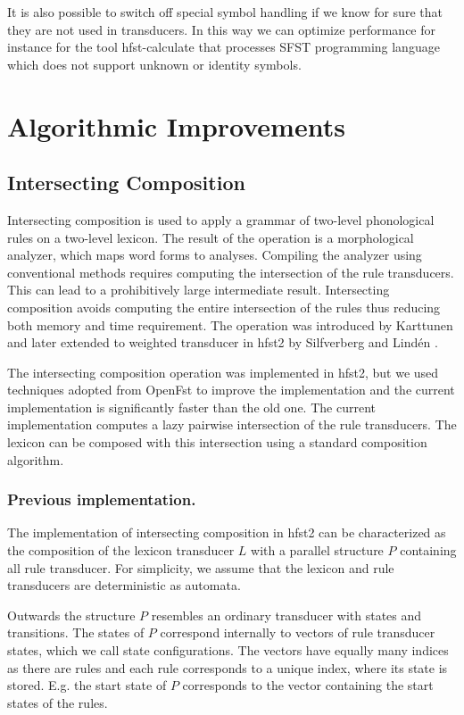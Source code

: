 \documentclass{llncs}
\begin{document}
It is also possible to switch off special symbol handling if we know
for sure that they are not used in transducers. 
In this way we can optimize performance for instance for the tool 
hfst-calculate that processes SFST programming language which does not
support unknown or identity symbols.


\section{Algorithmic Improvements}
\subsection{Intersecting Composition}

Intersecting composition is used to apply a grammar of two-level
phonological rules on a two-level lexicon. The result of the operation
is a morphological analyzer, which maps word forms to
analyses. Compiling the analyzer using conventional methods requires
computing the intersection of the rule transducers. This can lead to a
prohibitively large intermediate result. Intersecting composition
avoids computing the entire intersection of the rules thus reducing
both memory and time requirement. The operation was introduced by
Karttunen \cite{Karttunen/1994} and later extended to weighted
transducer in hfst2 by Silfverberg and Lind\'{e}n
\cite{silfverberg/2009/2}.

The intersecting composition operation was implemented in hfst2, but
we used techniques adopted from OpenFst \cite{openfst/2007} to improve
the implementation and the current implementation is significantly
faster than the old one. The current implementation computes a lazy
pairwise intersection of the rule transducers. The lexicon can be
composed with this intersection using a standard composition
algorithm.

\subsubsection{Previous implementation.}

The implementation of intersecting composition in hfst2 can be
characterized as the composition of the lexicon transducer $L$ with a
parallel structure $P$ containing all rule transducer. For simplicity,
we assume that the lexicon and rule transducers are deterministic as
automata.

Outwards the structure $P$ resembles an ordinary transducer with
states and transitions. The states of $P$ correspond internally to
vectors of rule transducer states, which we call state
configurations. The vectors have equally many indices as there are rules
and each rule corresponds to a unique index, where its state is
stored. E.g. the start state of $P$ corresponds to the vector
containing the start states of the rules.
\end{document}
